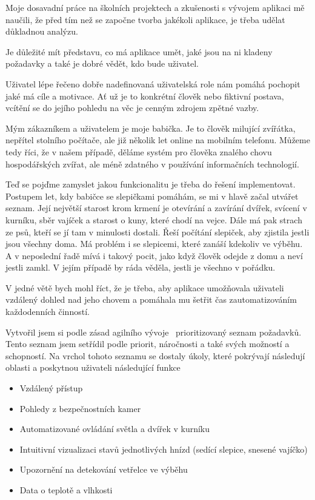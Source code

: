 Moje dosavadní práce na školních projektech a zkušenosti s vývojem aplikaci mě naučili, že před tím než se započne tvorba jakékoli aplikace, je třeba udělat důkladnou analýzu.

Je důležité mít představu, co má aplikace umět, jaké jsou na ni kladeny požadavky a také je dobré vědět, kdo bude uživatel.

Uživatel lépe řečeno dobře nadefinovaná uživatelská role nám pomáhá pochopit jaké má cíle a motivace.
Ať už je to konkrétní člověk nebo fiktivní postava, vcítění se do jejího pohledu na věc je cenným zdrojem zpětné vazby.

Mým zákazníkem a uživatelem je moje babička.
Je to člověk milující zvířátka, nepřítel stolního počítače, ale již několik let online na mobilním telefonu.
Můžeme tedy říci, že v našem případě, děláme systém pro člověka znalého chovu hospodářských zvířat, ale méně zdatného v používání informačních technologií.

Teď se pojďme zamyslet jakou funkcionalitu je třeba do řešení implementovat.
Postupem let, kdy babičce se slepičkami pomáhám, se mi v hlavě začal utvářet seznam.
Její největší starost krom krmení je otevírání a zavírání dvířek, svícení v kurníku, sběr vajíček a starost o kuny, které chodí na vejce.
Dále má pak strach ze psů, kteří se jí tam v minulosti dostali.
Řeší počítání slepiček, aby zjistila jestli jsou všechny doma.
Má problém i se slepicemi, které zanáší kdekoliv ve výběhu.
A v neposlední řadě mívá i takový pocit, jako když člověk odejde z domu a neví jestli zamkl.
V jejím případě by ráda věděla, jestli je všechno v pořádku.

V jedné větě bych mohl říct, že je třeba, aby aplikace umožňovala uživateli vzdálený dohled nad jeho chovem a pomáhala mu šetřit čas zautomatizováním každodenních činností.

Vytvořil jsem si podle zásad agilního vývoje~\cite{agile-manifesto} prioritizovaný seznam požadavků.
Tento seznam jsem setřídil podle priorit, náročnosti a také svých možností a schopností.
Na vrchol tohoto seznamu se dostaly úkoly, které pokrývají následují oblasti a poskytnou uživateli následující funkce

\begin{itemize}
    \item Vzdálený přístup
    \item Pohledy z bezpečnostních kamer
    \item Automatizované ovládání světla a dvířek v kurníku
    \item Intuitivní vizualizaci stavů jednotlivých hnízd (sedící slepice, snesené vajíčko)
    \item Upozornění na detekování vetřelce ve výběhu
    \item Data o teplotě a vlhkosti
\end{itemize}


\newpage
